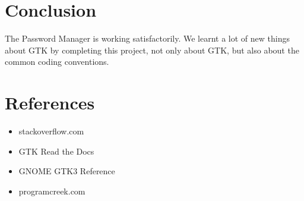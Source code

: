 \documentclass[10pt,a4paper,titlepage]{report}
\begin{document}
\chapter{Conclusion}
\newline\par The Password Manager is working satisfactorily. We learnt a lot of new things about GTK by completing this project, not only about GTK, but also about the common coding conventions. 

\chapter{References}
\begin{itemize}
		\item stackoverflow.com
		\item GTK Read the Docs
		\item GNOME GTK3 Reference
		\item programcreek.com
\end{itemize}
\end{document}
